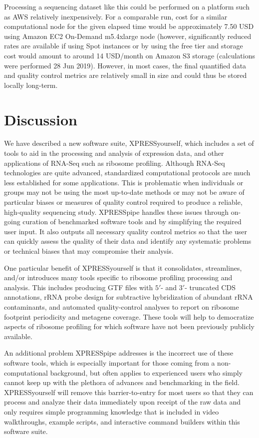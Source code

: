 \documentclass[10pt, oneside]{article}
\begin{document}
Processing a sequencing dataset like this could be performed on a platform such as AWS relatively inexpensively. For a comparable run, cost for a similar computational node for the given elapsed time would be approximately 7.50 USD using Amazon EC2 On-Demand m5.4xlarge node (however, significantly reduced rates are available if using Spot instances or by using the free tier and storage cost would amount to around 14 USD/month on Amazon S3 storage (calculations were performed 28 Jun 2019). However, in most cases, the final quantified data and quality control metrics are relatively small in size and could thus be stored locally long-term. \par


\section{Discussion}
We have described a new software suite, XPRESSyourself, which includes a set of tools to aid in the processing and analysis of expression data, and other applications of RNA-Seq such as ribosome profiling. Although RNA-Seq technologies are quite advanced, standardized computational protocols are much less established for some applications. This is problematic when individuals or groups may not be using the most up-to-date methods or may not be aware of particular biases or measures of quality control required to produce a reliable, high-quality sequencing study. XPRESSpipe handles these issues through on-going curation of benchmarked software tools and by simplifying the required user input. It also outputs all necessary quality control metrics so that the user can quickly assess the quality of their data and identify any systematic problems or technical biases that may compromise their analysis. \par

One particular benefit of XPRESSyourself is that it consolidates, streamlines, and/or introduces many tools specific to ribosome profiling processing and analysis. This includes producing GTF files with $5'$- and $3'$- truncated CDS annotations, rRNA probe design for subtractive hybridization of abundant rRNA contaminants, and automated quality-control analyses to report on ribosome footprint periodicity and metagene coverage. These tools will help to democratize aspects of ribosome profiling for which software have not been previously publicly available. \par

An additional problem XPRESSpipe addresses is the incorrect use of these software tools, which is especially important for those coming from a non-computational background, but often applies to experienced users who simply cannot keep up with the plethora of advances and benchmarking in the field. XPRESSyourself will remove this barrier-to-entry for most users so that they can process and analyze their data immediately upon receipt of the raw data and only requires simple programming knowledge that is included in video walkthroughs, example scripts, and interactive command builders within this software suite. \par
\end{document}
